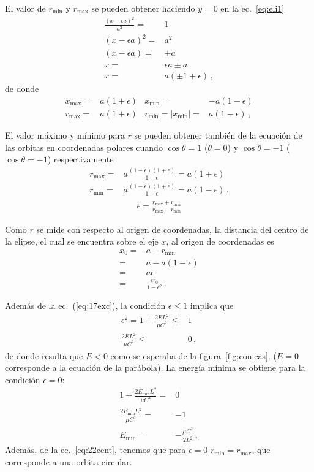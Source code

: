 El valor de $r_{\text{min}}$ y $r_{\text{max}}$ se pueden obtener haciendo $y=0$ en la ec.~\eqref{eq:eli1}
\begin{align}
  \frac{(x-\epsilon a)^2}{a^2}=&1\nonumber\\
  (x-\epsilon a)^2=&a^2\nonumber\\
  (x-\epsilon a)=&\pm a\nonumber\\
  x=&\epsilon a\pm a\nonumber\\
  x=&a(\pm 1+\epsilon)\,,
\end{align}
de donde
\begin{align}
  x_{\text{max}}=&a(1+\epsilon)&x_{\text{min}}=&-a(1-\epsilon)\nonumber\\
  r_{\text{max}}=&a(1+\epsilon)&r_{\text{min}}=|x_{\text{min}}|=&a(1-\epsilon)\,,
\end{align}







El valor máximo y mínimo para $r$ se pueden obtener también de la ecuación de las orbitas en coordenadas polares cuando $\cos\theta=1$ ($\theta=0$) y $\cos\theta=-1$ ($\cos\theta=-1$) respectivamente
\begin{align}
  \label{eq:22cent}
  r_{\text{max}}=&a\frac{(1-\epsilon)(1+\epsilon)}{1-\epsilon}=a(1+\epsilon)\nonumber\\
  r_{\text{min}}=&a\frac{(1-\epsilon)(1+\epsilon)}{1+\epsilon}=a(1-\epsilon)\,.
\end{align}
\begin{align*}
  \epsilon=\frac{r_{\text{max}}+r_{\text{min}}}{r_{\text{max}}-r_{\text{min}}}
\end{align*}

Como $r$ se mide con respecto al origen de coordenadas, la distancia del centro de la elipse, el cual se encuentra sobre el eje $x$, al origen de coordenadas es
\begin{align}
\label{eq:15}
  x_0=&a-r_{\text{min}}\nonumber\\
  =&a-a(1-\epsilon)\nonumber\\
  =&a\epsilon\nonumber\\
  =&\frac{\epsilon r_0}{1-\epsilon^2}\,.
\end{align}

Además de la ec.~(\ref{eq:17exc}), la condición $\epsilon\le 1$ implica que
\begin{align}
  \epsilon^2=1+\frac{2EL^2}{\mu C^2}\le&1\nonumber\\
  \frac{2EL^2}{\mu C^2}\le&0\,,
\end{align}
de donde resulta que $E<0$ como se esperaba de la figura~\ref{fig:conicas}. ($E=0$ corresponde a la ecuación de la parábola). La energía mínima se obtiene para la condición $\epsilon=0$:
\begin{align}
  1+\frac{2E_{\text{min}}L^2}{\mu C^2}=&0\nonumber\\
  \frac{2E_{\text{min}}L^2}{\mu C^2}=&-1\nonumber\\
  E_{\text{min}}=&-\frac{\mu C^2}{2L^2}\,,
\end{align}
Además, de la ec.~\eqref{eq:22cent}, tenemos que para $\epsilon=0$ $r_{\text{min}}=r_{\text{max}}$, que corresponde a una orbita circular.

